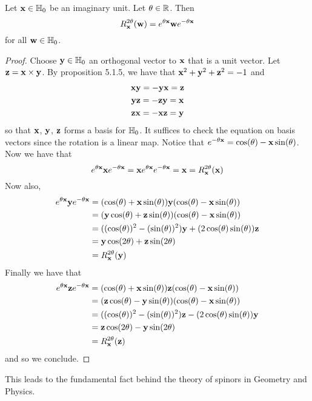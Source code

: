 \documentclass[a4paper]{article}
\begin{document}
\begin{lmm}{}{} Let $\vb{x}\in\mathbb{H}_0$ be an imaginary unit. Let $\theta\in\mathbb{R}$. Then $$R_{\vb{x}}^{2\theta}(\vb{w})=e^{\theta\vb{x}}\vb{w}e^{-\theta\vb{x}}$$ for all $\vb{w}\in\mathbb{H}_0$. \tcbline
\begin{proof}
Choose $\vb{y}\in\mathbb{H}_0$ an orthogonal vector to $\vb{x}$ that is a unit vector. Let $\vb{z}=\vb{x}\times\vb{y}$. By proposition 5.1.5, we have that $\vb{x}^2+\vb{y}^2+\vb{z}^2=-1$ and \begin{gather*}
\vb{x}\vb{y}=-\vb{y}\vb{x}=\vb{z}\\
\vb{y}\vb{z}=-\vb{z}\vb{y}=\vb{x}\\
\vb{z}\vb{x}=-\vb{x}\vb{z}=\vb{y}
\end{gather*} so that $\vb{x}$, $\vb{y}$, $\vb{z}$ forms a basis for $\mathbb{H}_0$. 
It suffices to check the equation on basis vectors since the rotation is a linear map. Notice that $e^{-\theta\vb{x}}=\cos(\theta)-\vb{x}\sin(\theta)$. Now we have that $$
e^{\theta\vb{x}}\vb{x}e^{-\theta\vb{x}}=\vb{x}e^{\theta\vb{x}}e^{-\theta\vb{x}}=\vb{x}=R_{\vb{x}}^{2\theta}(\vb{x})$$ Now also, 
\begin{align*}
e^{\theta\vb{x}}\vb{y}e^{-\theta\vb{x}}&=(\cos(\theta)+\vb{x}\sin(\theta))\vb{y}(\cos(\theta)-\vb{x}\sin(\theta))\\
&=(\vb{y}\cos(\theta)+\vb{z}\sin(\theta))(\cos(\theta)-\vb{x}\sin(\theta))\\
&=((\cos(\theta))^2-(\sin(\theta))^2)\vb{y}+(2\cos(\theta)\sin(\theta))\vb{z}\\
&=\vb{y}\cos(2\theta)+\vb{z}\sin(2\theta)\\
&=R_{\vb{x}}^{2\theta}(\vb{y})
\end{align*} Finally we have that 
\begin{align*}
e^{\theta\vb{x}}\vb{z}e^{-\theta\vb{x}}&=(\cos(\theta)+\vb{x}\sin(\theta))\vb{z}(\cos(\theta)-\vb{x}\sin(\theta))\\
&=(\vb{z}\cos(\theta)-\vb{y}\sin(\theta))(\cos(\theta)-\vb{x}\sin(\theta))\\
&=((\cos(\theta))^2-(\sin(\theta))^2)\vb{z}-(2\cos(\theta)\sin(\theta))\vb{y}\\
&=\vb{z}\cos(2\theta)-\vb{y}\sin(2\theta)\\
&=R_{\vb{x}}^{2\theta}(\vb{z})
\end{align*}
and so we conclude. 
\end{proof}
\end{lmm}

This leads to the fundamental fact behind the theory of spinors in Geometry and Physics. 
\end{document}

